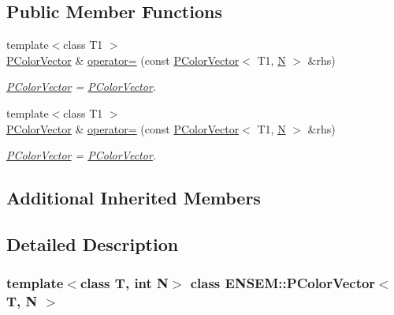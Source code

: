 \subsection*{Public Member Functions}
\begin{DoxyCompactItemize}
\item 
{\footnotesize template$<$class T1 $>$ }\\\mbox{\hyperlink{classENSEM_1_1PColorVector}{P\+Color\+Vector}} \& \mbox{\hyperlink{classENSEM_1_1PColorVector_ac5919a92dade0bb7763353ed7d05b8b2}{operator=}} (const \mbox{\hyperlink{classENSEM_1_1PColorVector}{P\+Color\+Vector}}$<$ T1, \mbox{\hyperlink{operator__name__util_8cc_a7722c8ecbb62d99aee7ce68b1752f337}{N}} $>$ \&rhs)
\begin{DoxyCompactList}\small\item\em \mbox{\hyperlink{classENSEM_1_1PColorVector}{P\+Color\+Vector}} = \mbox{\hyperlink{classENSEM_1_1PColorVector}{P\+Color\+Vector}}. \end{DoxyCompactList}\item 
{\footnotesize template$<$class T1 $>$ }\\\mbox{\hyperlink{classENSEM_1_1PColorVector}{P\+Color\+Vector}} \& \mbox{\hyperlink{classENSEM_1_1PColorVector_ac5919a92dade0bb7763353ed7d05b8b2}{operator=}} (const \mbox{\hyperlink{classENSEM_1_1PColorVector}{P\+Color\+Vector}}$<$ T1, \mbox{\hyperlink{operator__name__util_8cc_a7722c8ecbb62d99aee7ce68b1752f337}{N}} $>$ \&rhs)
\begin{DoxyCompactList}\small\item\em \mbox{\hyperlink{classENSEM_1_1PColorVector}{P\+Color\+Vector}} = \mbox{\hyperlink{classENSEM_1_1PColorVector}{P\+Color\+Vector}}. \end{DoxyCompactList}\end{DoxyCompactItemize}
\subsection*{Additional Inherited Members}


\subsection{Detailed Description}
\subsubsection*{template$<$class T, int N$>$\newline
class E\+N\+S\+E\+M\+::\+P\+Color\+Vector$<$ T, N $>$}

